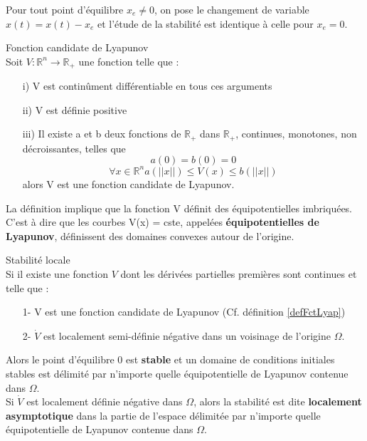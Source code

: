 Pour tout point d'équilibre $x_e \neq 0$, on pose le changement de variable $\hat{x}(t) = x(t)-x_e$ et l'étude de la stabilité est identique à celle pour $x_e = 0$.
\begin{definition} Fonction candidate de Lyapunov\\
	\label{defFctLyap}
	Soit $V : \mathbb{R}^n \rightarrow \mathbb{R}_+$ une fonction telle que : 
	\begin{itemize}
		\item[i)] V est continûment différentiable en tous ces arguments
		\item[ii)] V est définie positive
		\item[iii)] Il existe a et b deux fonctions de $\mathbb{R}_+$ dans $\mathbb{R}_+$, continues, monotones, non décroissantes, telles que
		\[a(0) = b(0) = 0\]
		\[\forall x \in \mathbb{R}^n a(||x||) \leq V(x) \leq b(||x||)\]
		alors V est une fonction candidate de Lyapunov.
	\end{itemize}
\end{definition}

\begin{rem}
	La définition implique que la fonction V définit des équipotentielles imbriquées. C'est à dire que les courbes V(x) = cste, appelées \textbf{équipotentielles de Lyapunov}, définissent des domaines convexes autour de l'origine.
\end{rem}

\begin{theo} Stabilité locale\\
	Si il existe une fonction $V$ dont les dérivées partielles premières sont continues et telle que :
	\begin{itemize}
		\item[1-] V est une fonction candidate de Lyapunov (Cf. définition \ref{defFctLyap})
		\item[2-] $\dot{V}$ est localement semi-définie négative dans un voisinage de l'origine $\Omega$.
	\end{itemize}
	
	Alors le point d'équilibre 0 est \textbf{stable} et un domaine de conditions initiales stables est délimité par n'importe quelle équipotentielle de Lyapunov contenue dans $\Omega$.\\
	Si $\dot{V}$ est localement définie négative dans $\Omega$, alors la stabilité est dite \textbf{localement asymptotique} dans la partie de l'espace délimitée par n'importe quelle équipotentielle de Lyapunov contenue dans $\Omega$.
\end{theo}

